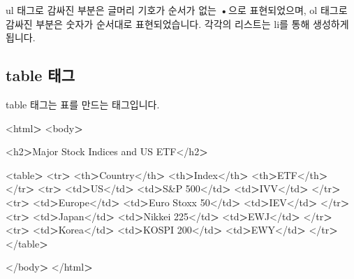 \documentclass[12pt,]{book}
\newenvironment{Shaded}{\begin{snugshade}}{\end{snugshade}}
\newcommand{\NormalTok}[1]{#1}
\newcommand{\OperatorTok}[1]{\textcolor[rgb]{0.81,0.36,0.00}{\textbf{#1}}}
\begin{document}
ul 태그로 감싸진 부분은 글머리 기호가 순서가 없는 \textbf{•}으로 표현되었으며, ol 태그로 감싸진 부분은 숫자가 순서대로 표현되었습니다. 각각의 리스트는 li를 통해 생성하게 됩니다.

\hypertarget{table-}{%
\subsection{table 태그}\label{table-}}

table 태그는 표를 만드는 태그입니다.

\begin{Shaded}
\begin{Highlighting}[]
\NormalTok{<html}\OperatorTok{>}
\NormalTok{<body}\OperatorTok{>}

\NormalTok{<h2}\OperatorTok{>}\NormalTok{Major Stock Indices and US ETF</h2}\OperatorTok{>}

\NormalTok{<table}\OperatorTok{>}
\NormalTok{  <tr}\OperatorTok{>}
\NormalTok{    <th}\OperatorTok{>}\NormalTok{Country</th}\OperatorTok{>}
\NormalTok{    <th}\OperatorTok{>}\NormalTok{Index</th}\OperatorTok{>}
\NormalTok{    <th}\OperatorTok{>}\NormalTok{ETF</th}\OperatorTok{>}
\NormalTok{  </tr}\OperatorTok{>}
\NormalTok{  <tr}\OperatorTok{>}
\NormalTok{    <td}\OperatorTok{>}\NormalTok{US</td}\OperatorTok{>}
\NormalTok{    <td}\OperatorTok{>}\NormalTok{S&P 500</td}\OperatorTok{>}
\NormalTok{    <td}\OperatorTok{>}\NormalTok{IVV</td}\OperatorTok{>}
\NormalTok{  </tr}\OperatorTok{>}
\NormalTok{  <tr}\OperatorTok{>}
\NormalTok{    <td}\OperatorTok{>}\NormalTok{Europe</td}\OperatorTok{>}
\NormalTok{    <td}\OperatorTok{>}\NormalTok{Euro Stoxx 50</td}\OperatorTok{>}
\NormalTok{    <td}\OperatorTok{>}\NormalTok{IEV</td}\OperatorTok{>}
\NormalTok{  </tr}\OperatorTok{>}
\NormalTok{  <tr}\OperatorTok{>}
\NormalTok{    <td}\OperatorTok{>}\NormalTok{Japan</td}\OperatorTok{>}
\NormalTok{    <td}\OperatorTok{>}\NormalTok{Nikkei 225</td}\OperatorTok{>}
\NormalTok{    <td}\OperatorTok{>}\NormalTok{EWJ</td}\OperatorTok{>}
\NormalTok{  </tr}\OperatorTok{>}
\NormalTok{  <tr}\OperatorTok{>}
\NormalTok{    <td}\OperatorTok{>}\NormalTok{Korea</td}\OperatorTok{>}
\NormalTok{    <td}\OperatorTok{>}\NormalTok{KOSPI 200</td}\OperatorTok{>}
\NormalTok{    <td}\OperatorTok{>}\NormalTok{EWY</td}\OperatorTok{>}
\NormalTok{  </tr}\OperatorTok{>}
\NormalTok{</table}\OperatorTok{>}

\NormalTok{</body}\OperatorTok{>}
\NormalTok{</html}\OperatorTok{>}
\end{Highlighting}
\end{Shaded}
\end{document}
